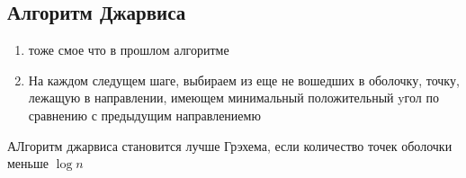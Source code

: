 \documentclass{scrartcl}
\begin{document}
\subsection{Алгоритм Джарвиса}
\begin{enumerate}
    \item тоже смое что в прошлом алгоритме
    \item На каждом следущем шаге, выбираем из
        еще не вошедших в оболочку, точку, лежащую в направлении, имеющем минимальный положительный yгол по сравнению с предыдущим направлениемю
\end{enumerate}
АЛгоритм джарвиса становится лучше Грэхема, если количество точек оболочки меньше $\log{n}$
\end{document}
